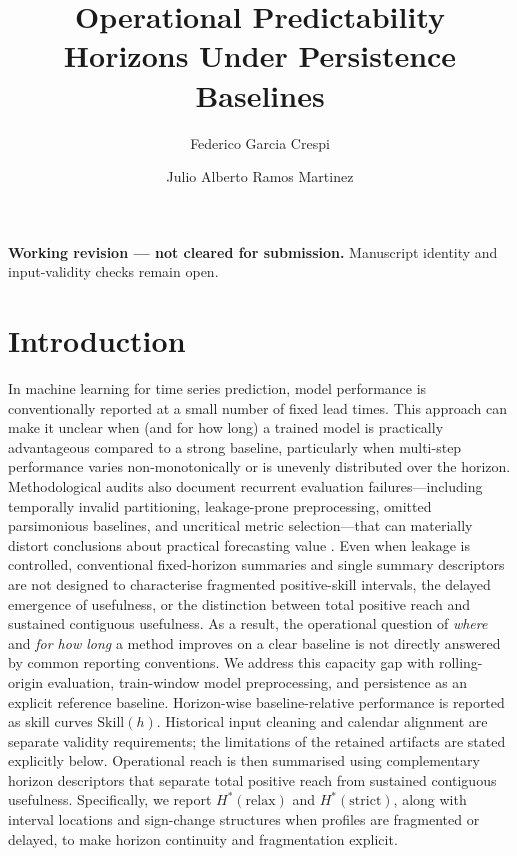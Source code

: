 \documentclass[pdflatex,sn-mathphys]{sn-jnl}
\title[Operational predictability horizons]{Operational Predictability Horizons Under Persistence Baselines}
\author*[1]{Federico Garcia Crespi}
\author[2]{Julio Alberto Ramos Martinez}
\affil[1]{Departamento de Ingenier\'ia de Computadores, Universidad Miguel Hern\'andez, Elche, Spain}
\affil[2]{Unidad de Docencia Online de la UMH, Universidad Miguel Hern\'andez, Elche, Spain (T\'ecnico de Innovaci\'on Docente)}
\begin{document}
\maketitle
\noindent\textbf{Working revision --- not cleared for submission.}
Manuscript identity and input-validity checks remain open.

\section{Introduction}
In machine learning for time series prediction, model performance is conventionally reported at a small number of fixed lead times. This approach can make it unclear when (and for how long) a trained model is practically advantageous compared to a strong baseline, particularly when multi-step performance varies non-monotonically or is unevenly distributed over the horizon. Methodological audits also document recurrent evaluation failures—including temporally invalid partitioning, leakage-prone preprocessing, omitted parsimonious baselines, and uncritical metric selection—that can materially distort conclusions about practical forecasting value \citep{hewamalage2023dmkd}. Even when leakage is controlled, conventional fixed-horizon summaries and single summary descriptors are not designed to characterise fragmented positive-skill intervals, the delayed emergence of usefulness, or the distinction between total positive reach and sustained contiguous usefulness. As a result, the operational question of \emph{where} and \emph{for how long} a method improves on a clear baseline is not directly answered by common reporting conventions.
We address this capacity gap with rolling-origin evaluation, train-window model preprocessing, and persistence as an explicit reference baseline. Horizon-wise baseline-relative performance is reported as skill curves $\mathrm{Skill}(h)$. Historical input cleaning and calendar alignment are separate validity requirements; the limitations of the retained artifacts are stated explicitly below.
Operational reach is then summarised using complementary horizon descriptors that separate total positive reach from sustained contiguous usefulness. Specifically, we report $H^*(\mathrm{relax})$ and $H^*(\mathrm{strict})$, along with interval locations and sign-change structures when profiles are fragmented or delayed, to make horizon continuity and fragmentation explicit.
\end{document}
